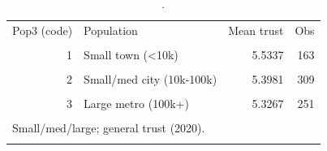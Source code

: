 \begin{table}[htbp]\centering
\caption{.}
\label{tab:trust_mean_by_population3_2020}
\begin{tabular}{rlrr}\toprule
Pop3 (code) & Population & Mean trust & Obs \\\\ \midrule
1 & Small town (<10k) & 5.5337 & 163 \\\\
2 & Small/med city (10k-100k) & 5.3981 & 309 \\\\
3 & Large metro (100k+) & 5.3267 & 251 \\\\
\bottomrule
\multicolumn{4}{l}{\footnotesize Small/med/large; general trust (2020).} \\\\
\end{tabular}\end{table}
